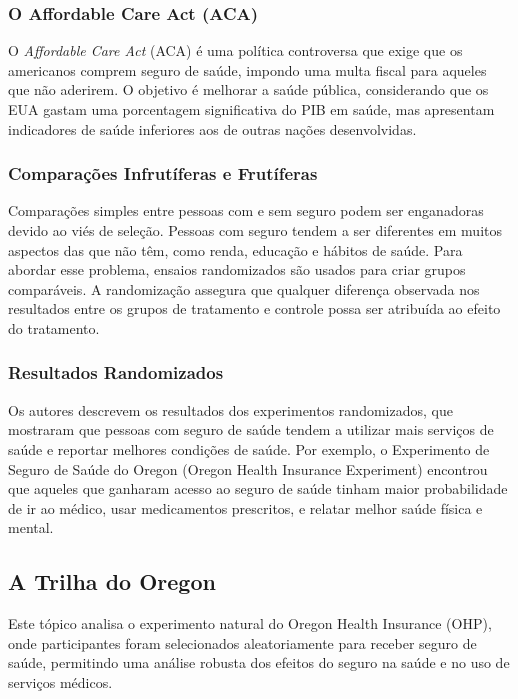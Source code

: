 \documentclass[a4paper,12pt]{article}[abntex2]
\begin{document}
\subsubsection*{O Affordable Care Act (ACA)}

O \textit{Affordable Care Act} (ACA) é uma política controversa que exige que os americanos comprem seguro de saúde, impondo uma multa fiscal para aqueles que não aderirem. O objetivo é melhorar a saúde pública, considerando que os EUA gastam uma porcentagem significativa do PIB em saúde, mas apresentam indicadores de saúde inferiores aos de outras nações desenvolvidas.

\subsubsection*{Comparações Infrutíferas e Frutíferas}

Comparações simples entre pessoas com e sem seguro podem ser enganadoras devido ao viés de seleção. Pessoas com seguro tendem a ser diferentes em muitos aspectos das que não têm, como renda, educação e hábitos de saúde. Para abordar esse problema, ensaios randomizados são usados para criar grupos comparáveis. A randomização assegura que qualquer diferença observada nos resultados entre os grupos de tratamento e controle possa ser atribuída ao efeito do tratamento.

\subsubsection*{Resultados Randomizados}

Os autores descrevem os resultados dos experimentos randomizados, que mostraram que pessoas com seguro de saúde tendem a utilizar mais serviços de saúde e reportar melhores condições de saúde. Por exemplo, o Experimento de Seguro de Saúde do Oregon (Oregon Health Insurance Experiment) encontrou que aqueles que ganharam acesso ao seguro de saúde tinham maior probabilidade de ir ao médico, usar medicamentos prescritos, e relatar melhor saúde física e mental.

\subsection{A Trilha do Oregon}

Este tópico analisa o experimento natural do Oregon Health Insurance (OHP), onde participantes foram selecionados aleatoriamente para receber seguro de saúde, permitindo uma análise robusta dos efeitos do seguro na saúde e no uso de serviços médicos.
\end{document}
